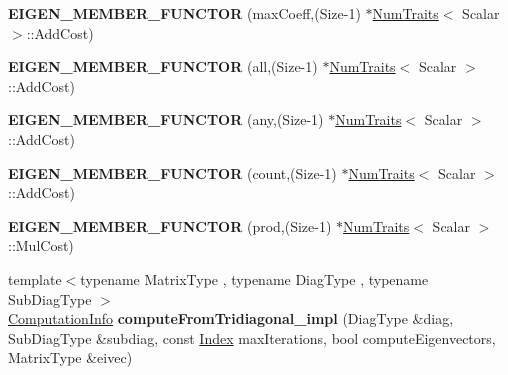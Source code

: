 \begin{DoxyCompactItemize}
\item 
\mbox{\label{namespace_eigen_1_1internal_a920afb1ffeeb1df9e20b5305d44b4e9e}} 
{\bfseries E\+I\+G\+E\+N\+\_\+\+M\+E\+M\+B\+E\+R\+\_\+\+F\+U\+N\+C\+T\+OR} (max\+Coeff,(Size-\/1) $\ast$\hyperlink{group___core___module_struct_eigen_1_1_num_traits}{Num\+Traits}$<$ Scalar $>$\+::Add\+Cost)
\item 
\mbox{\label{namespace_eigen_1_1internal_a5aa49c0ad0ba41a6fa7e0900181a0364}} 
{\bfseries E\+I\+G\+E\+N\+\_\+\+M\+E\+M\+B\+E\+R\+\_\+\+F\+U\+N\+C\+T\+OR} (all,(Size-\/1) $\ast$\hyperlink{group___core___module_struct_eigen_1_1_num_traits}{Num\+Traits}$<$ Scalar $>$\+::Add\+Cost)
\item 
\mbox{\label{namespace_eigen_1_1internal_a988e8c367db47dcf2de8007b672e0a3d}} 
{\bfseries E\+I\+G\+E\+N\+\_\+\+M\+E\+M\+B\+E\+R\+\_\+\+F\+U\+N\+C\+T\+OR} (any,(Size-\/1) $\ast$\hyperlink{group___core___module_struct_eigen_1_1_num_traits}{Num\+Traits}$<$ Scalar $>$\+::Add\+Cost)
\item 
\mbox{\label{namespace_eigen_1_1internal_a6bb963b8c61914561f26ad3cef3fde15}} 
{\bfseries E\+I\+G\+E\+N\+\_\+\+M\+E\+M\+B\+E\+R\+\_\+\+F\+U\+N\+C\+T\+OR} (count,(Size-\/1) $\ast$\hyperlink{group___core___module_struct_eigen_1_1_num_traits}{Num\+Traits}$<$ Scalar $>$\+::Add\+Cost)
\item 
\mbox{\label{namespace_eigen_1_1internal_a96b0b3e5538aa46b51c1db27fc372160}} 
{\bfseries E\+I\+G\+E\+N\+\_\+\+M\+E\+M\+B\+E\+R\+\_\+\+F\+U\+N\+C\+T\+OR} (prod,(Size-\/1) $\ast$\hyperlink{group___core___module_struct_eigen_1_1_num_traits}{Num\+Traits}$<$ Scalar $>$\+::Mul\+Cost)
\item 
\mbox{\label{namespace_eigen_1_1internal_a38da09fda4f78efb9723a482048c3d6c}} 
{\footnotesize template$<$typename Matrix\+Type , typename Diag\+Type , typename Sub\+Diag\+Type $>$ }\\\hyperlink{group__enums_ga85fad7b87587764e5cf6b513a9e0ee5e}{Computation\+Info} {\bfseries compute\+From\+Tridiagonal\+\_\+impl} (Diag\+Type \&diag, Sub\+Diag\+Type \&subdiag, const \hyperlink{namespace_eigen_a62e77e0933482dafde8fe197d9a2cfde}{Index} max\+Iterations, bool compute\+Eigenvectors, Matrix\+Type \&eivec)

\end{DoxyCompactItemize}
